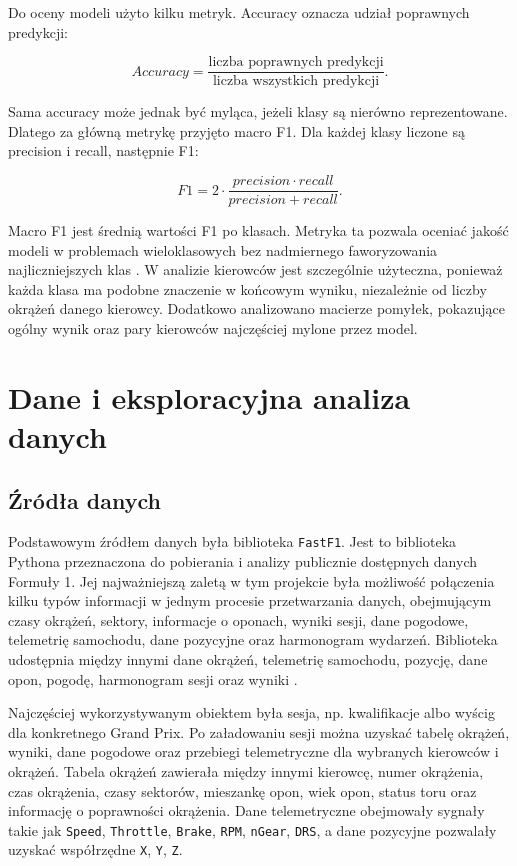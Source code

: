 \documentclass[printmode,pl]{mgr}
\begin{document}
Do oceny modeli użyto kilku metryk. Accuracy oznacza udział poprawnych predykcji:

\[
Accuracy = \frac{\text{liczba poprawnych predykcji}}{\text{liczba wszystkich predykcji}}.
\]

Sama accuracy może jednak być myląca, jeżeli klasy są nierówno reprezentowane. Dlatego za główną metrykę przyjęto macro F1. Dla każdej klasy liczone są precision i recall, następnie F1:

\[
F1 = 2 \cdot \frac{precision \cdot recall}{precision + recall}.
\]

Macro F1 jest średnią wartości F1 po klasach. Metryka ta pozwala oceniać jakość modeli w problemach wieloklasowych bez nadmiernego faworyzowania najliczniejszych klas \cite{sokolova2009}. W analizie kierowców jest szczególnie użyteczna, ponieważ każda klasa ma podobne znaczenie w końcowym wyniku, niezależnie od liczby okrążeń danego kierowcy. Dodatkowo analizowano macierze pomyłek, pokazujące ogólny wynik oraz pary kierowców najczęściej mylone przez model.

\chapter{Dane i eksploracyjna analiza danych}

\section{Źródła danych}

Podstawowym źródłem danych była biblioteka \texttt{FastF1}. Jest to biblioteka Pythona przeznaczona do pobierania i analizy publicznie dostępnych danych Formuły 1. Jej najważniejszą zaletą w tym projekcie była możliwość połączenia kilku typów informacji w jednym procesie przetwarzania danych, obejmującym czasy okrążeń, sektory, informacje o oponach, wyniki sesji, dane pogodowe, telemetrię samochodu, dane pozycyjne oraz harmonogram wydarzeń. Biblioteka udostępnia między innymi dane okrążeń, telemetrię samochodu, pozycję, dane opon, pogodę, harmonogram sesji oraz wyniki \cite{fastf1_docs}.

Najczęściej wykorzystywanym obiektem była sesja, np. kwalifikacje albo wyścig dla konkretnego Grand Prix. Po załadowaniu sesji można uzyskać tabelę okrążeń, wyniki, dane pogodowe oraz przebiegi telemetryczne dla wybranych kierowców i okrążeń. Tabela okrążeń zawierała między innymi kierowcę, numer okrążenia, czas okrążenia, czasy sektorów, mieszankę opon, wiek opon, status toru oraz informację o poprawności okrążenia. Dane telemetryczne obejmowały sygnały takie jak \texttt{Speed}, \texttt{Throttle}, \texttt{Brake}, \texttt{RPM}, \texttt{nGear}, \texttt{DRS}, a dane pozycyjne pozwalały uzyskać współrzędne \texttt{X}, \texttt{Y}, \texttt{Z}.
\end{document}
